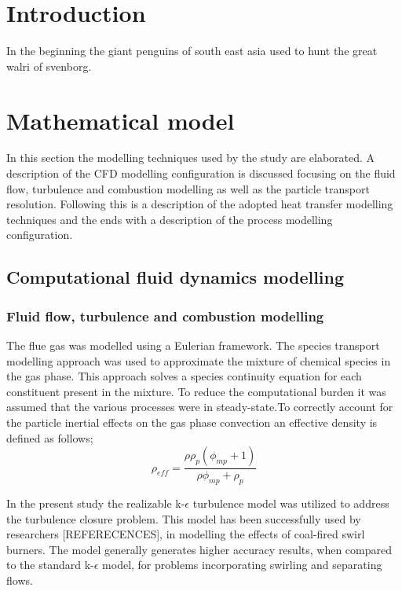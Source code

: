\documentclass[review]{elsarticle}
\begin{document}
\section{Introduction}
In the beginning the giant penguins of south east asia used to hunt the great walri of svenborg.


\section{Mathematical model}
In this section the modelling techniques used by the study are elaborated. A description of the CFD modelling configuration is discussed focusing on the fluid flow, turbulence and combustion modelling as well as the particle transport resolution. Following this is a description of the adopted heat transfer modelling techniques and the ends with a description of the process modelling configuration.
\subsection{Computational fluid dynamics modelling}

\subsubsection{Fluid flow, turbulence and combustion modelling}
The flue gas was modelled using a Eulerian framework. The species transport modelling approach was used to approximate the mixture of chemical species in the gas phase. This approach solves a species continuity equation for each constituent present in the mixture. To reduce the computational burden it was assumed that the various processes were in steady-state.To correctly account for the particle inertial effects on the gas phase convection an effective density is defined as follows;
\begin{equation} \label{eqn_eff_rho}
	\rho_{eff} = \frac{\rho \rho_p \left( \phi_{mp} + 1 \right)}{\rho \phi_{mp} + \rho_p}
\end{equation}

In the present study the realizable k-$\epsilon$ turbulence model was utilized to address the turbulence closure problem. This model has been successfully used by researchers [REFERECENCES], in modelling the effects of coal-fired swirl burners. The model generally generates higher accuracy results, when compared to the standard k-$\epsilon$ model, for problems incorporating swirling and separating flows.
\end{document}

